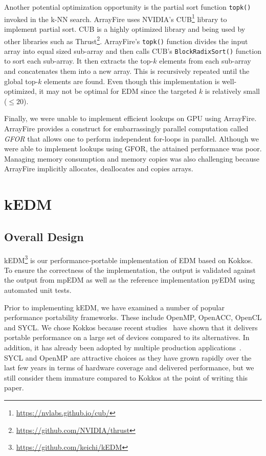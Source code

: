 \documentclass[sigconf]{acmart}
\begin{document}
Another potential optimization opportunity is the partial sort function
\texttt{topk()} invoked in the k-NN search. ArrayFire uses NVIDIA's
CUB\footnote{\url{https://nvlabs.github.io/cub/}} library to implement partial
sort. CUB is a highly optimized library and being used by other libraries such
as Thrust\footnote{\url{https://github.com/NVIDIA/thrust}}. ArrayFire's
\texttt{topk()} function divides the input array into equal sized sub-array
and then calls CUB's \texttt{BlockRadixSort()} function to sort each
sub-array. It then extracts the top-$k$ elements from each sub-array and
concatenates them into a new array. This is recursively repeated until the
global top-$k$ elements are found. Even though this implementation is
well-optimized, it may not be optimal for EDM since the targeted $k$ is
relatively small ($\leq 20$).

Finally, we were unable to implement efficient lookups on GPU using ArrayFire.
ArrayFire provides a construct for embarrassingly parallel computation called
\textit{GFOR} that allows one to perform independent for-loops in parallel.
Although we were able to implement lookups using GFOR, the attained
performance was poor. Managing memory consumption and memory copies was also
challenging because ArrayFire implicitly allocates, deallocates and copies
arrays.

\section{kEDM}\label{sec:proposal}

\subsection{Overall Design}

kEDM\footnote{\url{https://github.com/keichi/kEDM}} is our
performance-portable implementation of EDM based on Kokkos. To ensure the
correctness of the implementation, the output is validated against the output
from mpEDM as well as the reference implementation pyEDM using automated unit
tests.

Prior to implementing kEDM, we have examined a number of popular performance
portability frameworks. These include OpenMP, OpenACC, OpenCL and SYCL\@. We
chose Kokkos  because recent studies~\cite{Martineau2017, Deakin2019, Deakin2020}
have shown that it delivers portable performance on a large set of devices
compared to its alternatives. In addition, it has already been adopted by
multiple production applications~\cite{Sprague2020,Holmen2017,Demeshko2019}.
SYCL and OpenMP are attractive choices as they have grown rapidly over the
last few years in terms of hardware coverage and delivered performance, but we
still consider them immature compared to Kokkos at the point of writing this
paper.
\end{document}

